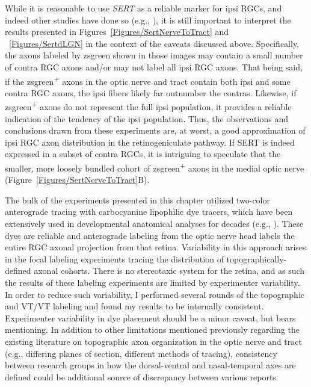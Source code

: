 While it is reasonable to use \emph{SERT} as a reliable marker for ipsi RGCs, and indeed other studies have done so (e.g., ), it is still important to interpret the results presented in Figures~\ref{Figures/SertNerveToTract} and ~\ref{Figures/SertdLGN} in the context of the caveats discussed above. 
Specifically, the axons labeled by zsgreen shown in those images may contain a small number of contra RGC axons and/or may not label all ipsi RGC axons.
That being said, if the zsgreen\textsuperscript{+} axons in the optic nerve and tract contain both ipsi and some contra RGC axons, the ipsi fibers likely far outnumber the contras. 
Likewise, if zsgreen\textsuperscript{+} axons do not represent the full ipsi population, it provides a reliable indication of the tendency of the ipsi population.
Thus, the observations and conclusions drawn from these experiments are, at worst, a good approximation of ipsi RGC axon distribution in the retinogeniculate pathway.
If SERT is indeed expressed in a subset of contra RGCs, it is intriguing to speculate that the smaller, more loosely bundled cohort of zsgreen\textsuperscript{+} axons in the medial optic nerve (Figure~\ref{Figures/SertNerveToTract}B).

The bulk of the experiments presented in this chapter utilized two-color anterograde tracing with carbocyanine lipophilic dye tracers, which have been extensively used in developmental anatomical analyses for decades (e.g., ).
These dyes are reliable and anterograde labeling from the optic nerve head labels the entire RGC axonal projection from that retina.
Variability in this approach arises in the focal labeling experiments tracing the distribution of topographically-defined axonal cohorts.
There is no stereotaxic system for the retina, and as such the results of these labeling experiments are limited by experimenter variability.
In order to reduce such variability, I performed several rounds of the topographic and VT/VT labeling and found my results to be internally consistent.
Experimenter variability in dye placement should be a minor caveat, but bears mentioning.
In addition to other limitations mentioned previously regarding the existing literature on topographic axon organization in the optic nerve and tract (e.g., differing planes of section, different methods of tracing), consistency between research groups in how the dorsal-ventral and nasal-temporal axes are defined could be additional source of discrepancy between various reports.

